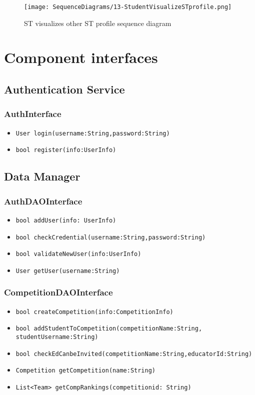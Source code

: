 \begin{figure}[H]
  \centering
  \texttt{[image: SequenceDiagrams/13-StudentVisualizeSTprofile.png]}
  \caption{ST visualizes other ST profile sequence diagram}
  \label{fig:st_visualizes_other_st_profile}
\end{figure}

\section{Component interfaces}
\label{s:component-interfaces}%


\subsection{Authentication Service}
\subsubsection{AuthInterface}
\begin{itemize}
    \item \texttt{User login(username:String,password:String)}%
    \item \texttt{bool register(info:UserInfo)} %
\end{itemize}

\subsection{Data Manager}
\subsubsection{AuthDAOInterface}
\begin{itemize}
    \item \texttt{bool addUser(info: UserInfo)}%
    \item \texttt{bool checkCredential(username:String,password:String)}%
    \item \texttt{bool validateNewUser(info:UserInfo)}%
    \item \texttt{User getUser(username:String)}%
\end{itemize}

\subsubsection{CompetitionDAOInterface}
\begin{itemize}
    \item \texttt{bool createCompetition(info:CompetitionInfo)}
    \item \texttt{bool addStudentToCompetition(competitionName:String, studentUsername:String)}
    \item \texttt{bool checkEdCanbeInvited(competitionName:String,educatorId:String)}%
    \item \texttt{Competition getCompetition(name:String)}%
    \item \texttt{List<Team> getCompRankings(competitionid: String)}
\end{itemize}

